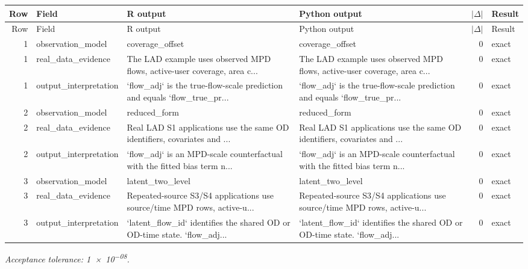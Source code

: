 \documentclass[10pt]{article}
\begin{document}
\small
\begin{longtable}{@{}r p{}p{}p{}rl@{}}
\toprule
Row & Field & R output & Python output & $|\Delta|$ & Result \\
\midrule
\endfirsthead
\toprule
Row & Field & R output & Python output & $|\Delta|$ & Result \\
\midrule
\endhead
1 & observation\_\allowbreak{}model & coverage\_\allowbreak{}offset & coverage\_\allowbreak{}offset & 0 & exact \\
1 & real\_\allowbreak{}data\_\allowbreak{}evidence & The LAD example uses observed MPD flows, active-user coverage, area c... & The LAD example uses observed MPD flows, active-user coverage, area c... & 0 & exact \\
1 & output\_\allowbreak{}interpretation & `flow\_\allowbreak{}adj` is the true-flow-scale prediction and equals `flow\_\allowbreak{}true\_\allowbreak{}pr... & `flow\_\allowbreak{}adj` is the true-flow-scale prediction and equals `flow\_\allowbreak{}true\_\allowbreak{}pr... & 0 & exact \\
2 & observation\_\allowbreak{}model & reduced\_\allowbreak{}form & reduced\_\allowbreak{}form & 0 & exact \\
2 & real\_\allowbreak{}data\_\allowbreak{}evidence & Real LAD S1 applications use the same OD identifiers, covariates and ... & Real LAD S1 applications use the same OD identifiers, covariates and ... & 0 & exact \\
2 & output\_\allowbreak{}interpretation & `flow\_\allowbreak{}adj` is an MPD-scale counterfactual with the fitted bias term n... & `flow\_\allowbreak{}adj` is an MPD-scale counterfactual with the fitted bias term n... & 0 & exact \\
3 & observation\_\allowbreak{}model & latent\_\allowbreak{}two\_\allowbreak{}level & latent\_\allowbreak{}two\_\allowbreak{}level & 0 & exact \\
3 & real\_\allowbreak{}data\_\allowbreak{}evidence & Repeated-source S3/\allowbreak{}S4 applications use source/\allowbreak{}time MPD rows, active-u... & Repeated-source S3/\allowbreak{}S4 applications use source/\allowbreak{}time MPD rows, active-u... & 0 & exact \\
3 & output\_\allowbreak{}interpretation & `latent\_\allowbreak{}flow\_\allowbreak{}id` identifies the shared OD or OD-time state. `flow\_\allowbreak{}adj... & `latent\_\allowbreak{}flow\_\allowbreak{}id` identifies the shared OD or OD-time state. `flow\_\allowbreak{}adj... & 0 & exact \\
\bottomrule
\end{longtable}
\normalsize
\textit{Acceptance tolerance: \num{1e-08}.}
\end{document}
